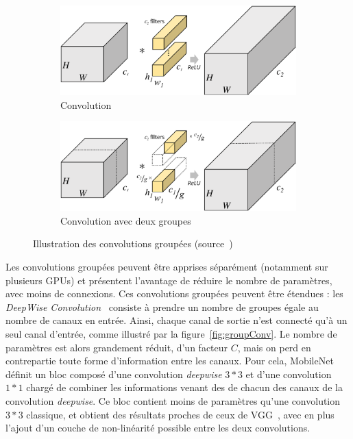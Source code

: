 \begin{figure}%

\begin{subfigure}{\textwidth}
	\includegraphics[width=\columnwidth]{figures/convlayer.eps}%
	\caption{Convolution}%
	\label{fig:convsimple1}%
\end{subfigure}

\begin{subfigure}{\textwidth}
	\includegraphics[width=\columnwidth]{figures/filtergroups2.eps}%
	\caption{Convolution avec deux groupes}%
	\label{fig:convsimple2}%
\end{subfigure}

\caption{Illustration des convolutions groupées (source~\cite{ioannou2017deep})}
\label{fig:groupConv1}

\end{figure}

Les convolutions groupées peuvent être apprises séparément (notamment sur plusieurs GPUs) et présentent l'avantage de réduire le nombre de paramètres, avec moins de connexions.
Ces convolutions groupées peuvent être étendues : les \textit{DeepWise Convolution}~\cite{howard2017mobilenets} consiste à prendre un nombre de groupes égale au nombre de canaux en entrée.
Ainsi, chaque canal de sortie n’est connecté qu’à un seul canal d’entrée, comme illustré par la figure~\ref{fig:groupConv}.
Le nombre de paramètres est alors grandement réduit, d'un facteur $C$, mais on perd en contrepartie toute forme d'information entre les canaux.
Pour cela, MobileNet~\cite{howard2017mobilenets} définit un bloc composé d'une convolution \textit{deepwise} $3*3$ et d'une convolution $1*1$ chargé de combiner les informations venant des de chacun des canaux de la convolution \textit{deepwise}.
Ce bloc contient moins de paramètres qu'une convolution $3*3$ classique, et obtient des résultats proches de ceux de VGG~\cite{howard2017mobilenets}, avec en plus l'ajout d'un couche de non-linéarité possible entre les deux convolutions.

